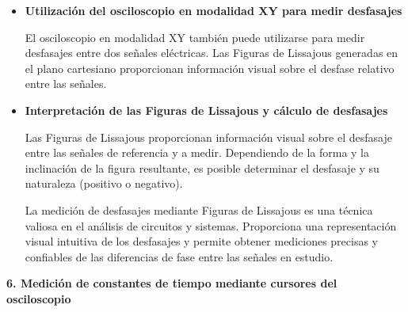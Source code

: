 \documentclass[12pt]{article}
\begin{document}
	\begin{itemize}
		\item \textbf{Utilización del osciloscopio en modalidad XY para medir desfasajes}
		
		El osciloscopio en modalidad XY también puede utilizarse para medir desfasajes entre dos señales eléctricas. Las Figuras de Lissajous generadas en el plano cartesiano proporcionan información visual sobre el desfase relativo entre las señales.
		
		\item \textbf{Interpretación de las Figuras de Lissajous y cálculo de desfasajes}
		
		Las Figuras de Lissajous proporcionan información visual sobre el desfasaje entre las señales de referencia y a medir. Dependiendo de la forma y la inclinación de la figura resultante, es posible determinar el desfasaje y su naturaleza (positivo o negativo).
		
		La medición de desfasajes mediante Figuras de Lissajous es una técnica valiosa en el análisis de circuitos y sistemas. Proporciona una representación visual intuitiva de los desfasajes y permite obtener mediciones precisas y confiables de las diferencias de fase entre las señales en estudio.
	\end{itemize}
	
	\textbf{6. Medición de constantes de tiempo mediante cursores del osciloscopio}
	
\end{document}
